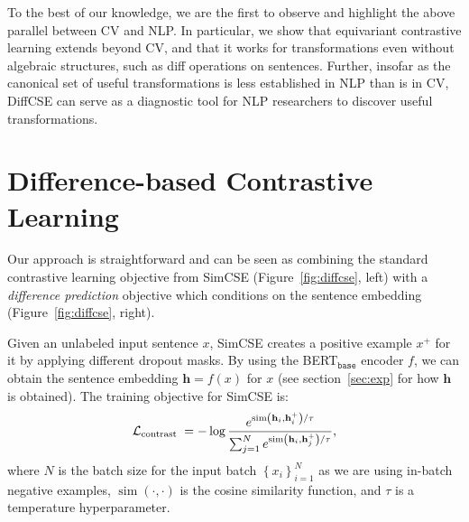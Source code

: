 \documentclass[11pt]{article}
\newcommand{\ba}{$_\texttt{base}$\xspace}
\begin{document}
To the best of our knowledge, we are the first to observe and highlight the above parallel between CV and NLP. In particular, we show that equivariant contrastive learning extends beyond CV, and that it works for transformations even without algebraic structures, such as diff operations on sentences. Further, insofar as the canonical set of useful transformations is less established in NLP than is in CV, DiffCSE can serve as a diagnostic tool for NLP researchers to discover useful transformations.


\section{Difference-based Contrastive Learning}
\label{sec:method}


Our approach is straightforward and can be seen as combining the standard contrastive learning objective from SimCSE (Figure~\ref{fig:diffcse}, left) with a \emph{difference prediction} objective which conditions on the sentence embedding (Figure~\ref{fig:diffcse}, right). 


Given an unlabeled input sentence $x$, SimCSE creates a positive example $x^{+}$ for it by applying different dropout masks. By using the {BERT\ba} encoder $f$, we can obtain the sentence embedding $\mathbf{h}=f\left(x\right)$ for $x$ (see section~\ref{sec:exp} for how $\mathbf{h}$ is obtained). The training objective for SimCSE is:
\vspace{-5pt}
\begin{align*}
    \mathcal{L}_{\text {contrast }} = -\log \frac{e^{\operatorname{sim}\left(\mathbf{h}_{i}, \mathbf{h}_{i}^{+}\right) / \tau}}{\sum_{j=1}^{N}e^{\operatorname{sim}\left(\mathbf{h}_{i}, \mathbf{h}_{j}^{+}\right) / \tau}},
    \vspace{-5pt}
\end{align*}
where $N$ is the batch size for the input batch $\left\{x_{i}\right\}_{i=1}^{N}$ as we are using in-batch negative examples, $\operatorname{sim}(\cdot, \cdot)$ is the cosine similarity function, and $\tau$ is a temperature hyperparameter.
\end{document}

